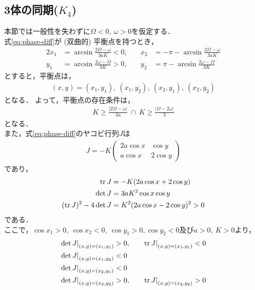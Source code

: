 \documentclass[../main]{subfiles}
\begin{document}
    \subsection{3体の同期($K_4$)}
    \label{sec:3body-k4}
    本節では一般性を失わずに$\Omega<0,\ \omega>0$を仮定する．\\
    式\eqref{eq:phase-diff}が (双曲的) 平衡点を持つとき，
    \begin{alignat*}{2}
        x_1&=\arcsin \frac{2\Omega-\omega}{3aK}<0,&\quad x_2&=-\pi-\arcsin \frac{2\Omega-\omega}{3aK}\\
        y_1&=\arcsin \frac{2\omega-\Omega}{3K}>0,&\quad y_2&=\pi-\arcsin \frac{2\omega-\Omega}{3K}
    \end{alignat*}
    とすると，平衡点は，
    \begin{align*}
        (x,y)=(x_1,y_1),\ (x_1,y_2),\ (x_2,y_1),\ (x_2,y_2)
    \end{align*}
    となる．
    よって，平衡点の存在条件は，
    \begin{align*}
        K\geq \frac{|2\Omega-\omega|}{3a}\ \cap \ K\geq \frac{|\Omega-2\omega|}{3}
    \end{align*}
    となる．\\
    また，式\eqref{eq:phase-diff}のヤコビ行列$J$は
    \begin{align*}
        J=-K\begin{pmatrix}
            2a\cos x&\cos y\\
            a\cos x&2\cos y
        \end{pmatrix}
    \end{align*}
    であり，
    \begin{align*}
        \tr J&=-K(2a\cos x+2\cos y)\\
        \det J&=3aK^2\cos x\cos y\\
        (\tr J)^2-4\det J&=K^2(2a\cos x-2\cos y)^2> 0
    \end{align*}
    である．\\
    ここで，$\cos x_1>0,\ \cos x_2<0,\ \cos y_1>0,\cos y_2<0$及び$a>0,\ K>0$より，
    \begin{alignat*}{2}
        \left.\det J \right|_{(x,y)=(x_1,y_1)}&>0, &\quad  \left.\tr J \right|_{(x,y)=(x_1,y_1)}&<0\\
        \left.\det J \right|_{(x,y)=(x_1,y_2)}&<0 & &\\
        \left.\det J \right|_{(x,y)=(x_2,y_1)}&<0 & &\\
        \left.\det J \right|_{(x,y)=(x_2,y_2)}&>0, &\quad  \left.\tr J \right|_{(x,y)=(x_2,y_2)}&>0
    \end{alignat*}
\end{document}
